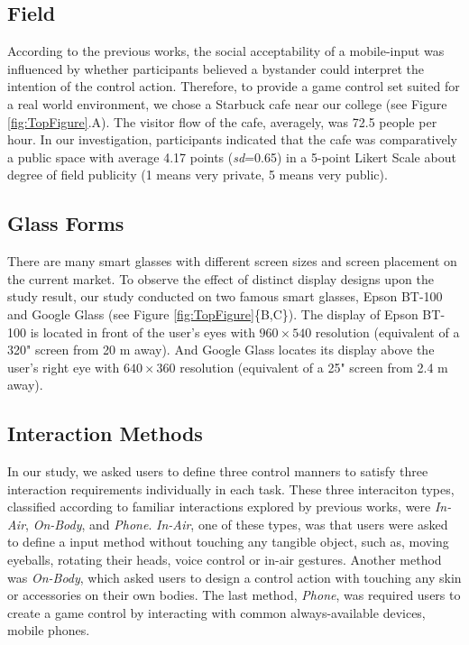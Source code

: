 \documentclass{sigchi}
\begin{document}
  \subsection {Field}
  According to the previous works\cite{Wiliamson:2011:MMI:2070481.2070551,Williamson:2013:MEM:2522848.2522874,Montero:2010:YUS:1851600.1851647,Rico:2010:UGM:1753326.1753458}, the social acceptability of a mobile-input was influenced by whether participants believed a bystander could interpret the intention of the control action. Therefore, to provide a game control set suited for a real world environment, we chose a Starbuck cafe near our college (see Figure \ref{fig:TopFigure}.A). The visitor flow of the cafe, averagely, was 72.5 people per hour. In our investigation, participants indicated that the cafe was comparatively a public space with average 4.17 points (\textsl{sd}=0.65) in a 5-point Likert Scale about degree of field publicity (1 means very private, 5 means very public).    

  \subsection {Glass Forms}
  There are many smart glasses with different screen sizes and screen placement on the current market. To observe the effect of distinct display designs upon the study result, our study conducted on two famous smart glasses, Epson BT-100 and Google Glass (see Figure \ref{fig:TopFigure}\{B,C\}). The display of Epson BT-100 is located in front of the user's eyes with $960 \times 540$ resolution (equivalent of a 320" screen from 20 m away)\cite{BT100}. And Google Glass locates its display above the user's right eye with $640 \times 360$ resolution (equivalent of a 25" screen from 2.4 m away)\cite{GoogleGlass}.       

    \subsection {Interaction Methods}
    In our study, we asked users to define three control manners to satisfy three interaction requirements individually in each task. These three interaciton types, classified according to familiar interactions explored by previous works, were \textsl{In-Air}, \textsl{On-Body}, and \textsl{Phone}. \textsl{In-Air}, one of these types, was that users were asked to define a input method without touching any tangible object, such as, moving eyeballs, rotating their heads, voice control or in-air gestures. Another method was \textsl{On-Body}, which asked users to design a control action with touching any skin or accessories on their own bodies. The last method, \textsl{Phone}, was required users to create a game control by interacting with common always-available devices, mobile phones.    
\end{document}
